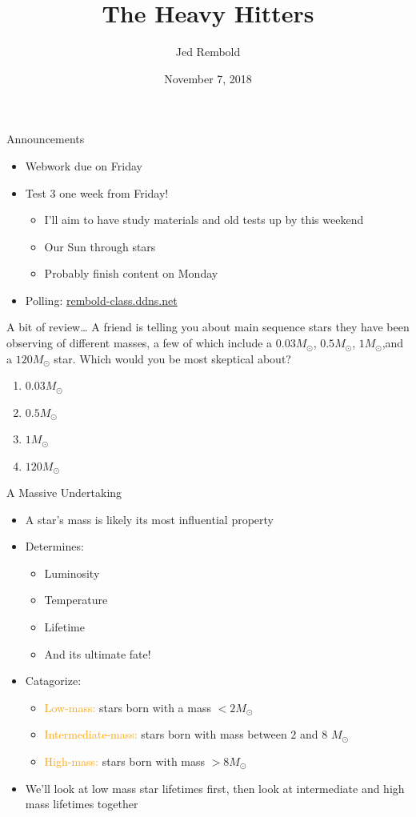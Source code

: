 \documentclass[pdf, aspectratio=169]{beamer}
\title{The Heavy Hitters}
\date{November 7, 2018}
\author{Jed Rembold}
\begin{document}
\renewcommand*{\theenumi}{\Alph{enumi}}

\begin{frame}{Announcements}
  \begin{itemize}
	\item Webwork due on Friday
	\item Test 3 one week from Friday!
		\begin{itemize}
			\item I'll aim to have study materials and old tests up by this weekend
			\item Our Sun through stars
			\item Probably finish content on Monday
		\end{itemize}
	\item Polling: \url{rembold-class.ddns.net}
  \end{itemize}
\end{frame}

\begin{frame}{A bit of review\ldots}
	A friend is telling you about main sequence stars they have been observing of different masses, a few of which include a $0.03 M_\odot$, $0.5 M_\odot$, $1 M_\odot$,and a $120 M_\odot$ star. Which would you be most skeptical about?
  \begin{enumerate}
	  \item \alert<2>{$0.03M_\odot$}
	  \item $0.5M_\odot$
	  \item $1M_\odot$
	  \item $120M_\odot$
  \end{enumerate}
\end{frame}

\begin{frame}{A Massive Undertaking}
  \begin{itemize}
	\item A star's mass is likely its most influential property
	\item Determines:
	  \begin{itemize}
		\item Luminosity
		\item Temperature
		\item Lifetime
		\item \alert{And its ultimate fate!}
	  \end{itemize}
	\item Catagorize:
	  \begin{itemize}
		\item \textcolor{orange}{Low-mass:} stars born with a mass $<2M_\odot$
		\item \textcolor{orange}{Intermediate-mass:} stars born with mass between $2$ and $8$ $M_\odot$
		\item \textcolor{orange}{High-mass:} stars born with mass $>8 M_\odot$
	  \end{itemize}
	\item<2> \alert{We'll look at low mass star lifetimes first, then look at intermediate and high mass lifetimes together}
  \end{itemize}
\end{frame}
\end{document}
